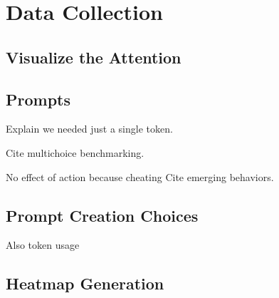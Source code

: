 \chapter{Data Collection}
\label{cha:data_collection}

\section{Visualize the Attention}
\label{sec:visualize_the_attention}

\section{Prompts}
\label{sec:prompts}

Explain we needed just a single token.

Cite multichoice benchmarking.

No effect of action because cheating \textrightarrow Cite emerging behaviors.
\section{Prompt Creation Choices}
\label{sec:prompt_creation_choices}

Also token usage

\section{Heatmap Generation}
\label{sec:heatmap_generation}
